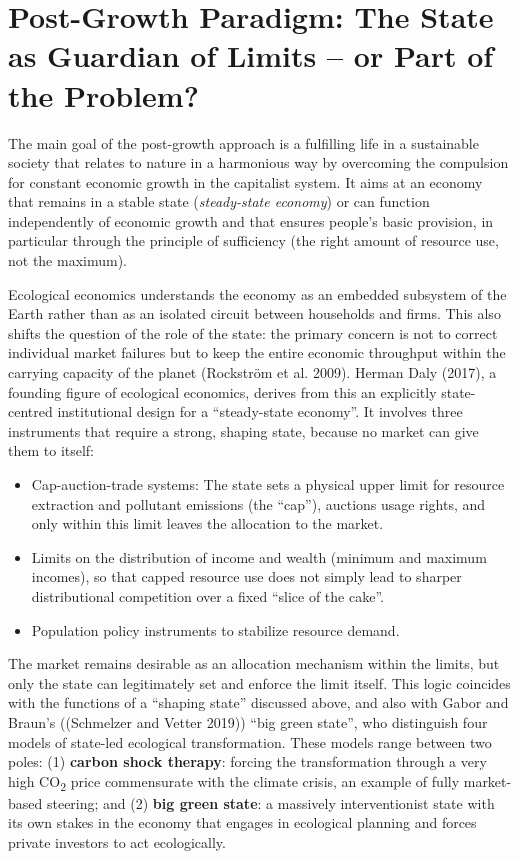 \documentclass[
  british,
  a4paper,
  DIV=11,
  numbers=noendperiod,
  oneside,
  openany]{scrreprt}
\begin{document}
\section{Post-Growth Paradigm: The State as Guardian of Limits -- or
Part of the
Problem?}\label{post-growth-paradigm-the-state-as-guardian-of-limits-or-part-of-the-problem}

The main goal of the post-growth approach is a fulfilling life in a
sustainable society that relates to nature in a harmonious way by
overcoming the compulsion for constant economic growth in the capitalist
system. It aims at an economy that remains in a stable state
(\emph{steady-state economy}) or can function independently of economic
growth and that ensures people's basic provision, in particular through
the principle of sufficiency (the right amount of resource use, not the
maximum).

Ecological economics understands the economy as an embedded subsystem of
the Earth rather than as an isolated circuit between households and
firms. This also shifts the question of the role of the state: the
primary concern is not to correct individual market failures but to keep
the entire economic throughput within the carrying capacity of the
planet (Rockström et al. 2009). Herman Daly (2017), a founding figure of
ecological economics, derives from this an explicitly state-centred
institutional design for a ``steady-state economy''. It involves three
instruments that require a strong, shaping state, because no market can
give them to itself:

\begin{itemize}
\item
  Cap-auction-trade systems: The state sets a physical upper limit for
  resource extraction and pollutant emissions (the ``cap''), auctions
  usage rights, and only within this limit leaves the allocation to the
  market.
\item
  Limits on the distribution of income and wealth (minimum and maximum
  incomes), so that capped resource use does not simply lead to sharper
  distributional competition over a fixed ``slice of the cake''.
\item
  Population policy instruments to stabilize resource demand.
\end{itemize}

The market remains desirable as an allocation mechanism within the
limits, but only the state can legitimately set and enforce the limit
itself. This logic coincides with the functions of a ``shaping state''
discussed above, and also with Gabor and Braun's ((Schmelzer and Vetter
2019)) ``big green state'', who distinguish four models of state-led
ecological transformation. These models range between two poles: (1)
\textbf{carbon shock therapy}: forcing the transformation through a very
high CO\textsubscript{2} price commensurate with the climate crisis, an
example of fully market-based steering; and (2) \textbf{big green
state}: a massively interventionist state with its own stakes in the
economy that engages in ecological planning and forces private investors
to act ecologically.
\end{document}
